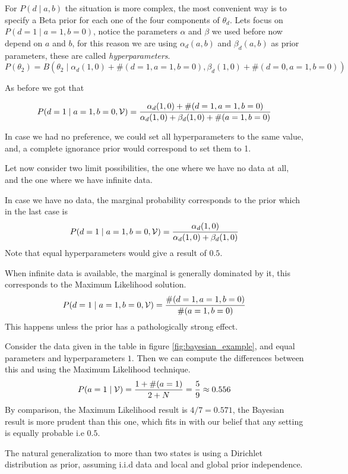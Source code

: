 For \(P(d \mid a ,b)\) the situation is more complex, the most convenient way is
to specify a Beta prior for each one of the four components of \(\theta_{d}\).
Lets focus on \(P(d = 1 \mid a = 1, b = 0)\), notice the parameters \(\alpha\)
and \(\beta\) we used before now depend on \(a\) and \(b\), for this reason we
are using \(\alpha_{d}(a,b)\) and \(\beta_{d}(a,b)\) as prior parameters, these
are called \emph{hyperparameters}.
\[
  P(\theta_{2}) = B(\theta_{2} \mid \alpha_{d}(1,0) + \#(d = 1, a = 1, b = 0), \beta_{d}(1,0) + \#(d = 0, a = 1, b = 0))
\]

As before we got that

\[
  P(d = 1 \mid a = 1, b = 0, \mathcal{V}) = \frac{\alpha_{d}(1,0) + \#(d = 1, a = 1, b = 0)}{\alpha_{d}(1,0) + \beta_{d}(1,0) + \#(a=1, b = 0)}
\]

In case we had no preference, we could set all hyperparameters to the same
value, and, a complete ignorance prior would correspond to set them to 1.

Let now consider two limit possibilities, the one where we have no data at all,
and the one where we have infinite data.

In case we have no data, the marginal probability corresponds to the prior which
in the last case is
\[
   P(d = 1 \mid a = 1, b = 0, \mathcal{V}) = \frac{\alpha_{d}(1,0)}{\alpha_{d}(1,0) + \beta_{d}(1,0)}
 \]
 Note that equal hyperparameters would give a result of \(0.5\).

 When infinite data is available, the marginal is generally dominated by it,
 this corresponds to the Maximum Likelihood solution.
 \[
   P(d = 1 \mid a = 1, b = 0, \mathcal{V}) = \frac{\#(d = 1, a = 1 , b = 0)}{\#(a = 1, b = 0)}
 \]
 This happens unless the prior has a pathologically strong effect.

 Consider the data given in the table in figure \ref{fig:bayesian_example}, and
 equal parameters and hyperparameters \(1\). Then we can compute the differences
 between this and using the Maximum Likelihood technique.
 \[
   P(a = 1 \mid \mathcal{V}) = \frac{1 + \#(a = 1)}{2 + N} = \frac{5}{9} \approx 0.556
 \]
 By comparison, the Maximum Likelihood result is \(4/7 = 0.571\), the Bayesian
 result is more prudent than this one, which fits in with our belief that any
 setting is equally probable i.e \(0.5\).


 The natural generalization to more than two states is using a Dirichlet
 distribution as prior, assuming i.i.d data and local and global prior independence.

